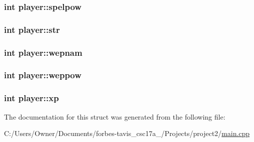 \subsubsection[{spelpow}]{\setlength{\rightskip}{0pt plus 5cm}int player\+::spelpow}\label{structplayer_a0f0f1c33783beaaade2cdd81a5667f98}
\hypertarget{structplayer_a3f5afbd398724555af2babef3175b4f5}{}
\subsubsection[{str}]{\setlength{\rightskip}{0pt plus 5cm}int player\+::str}\label{structplayer_a3f5afbd398724555af2babef3175b4f5}
\hypertarget{structplayer_af54eae2ad746a6678b9128b652abf56e}{}
\subsubsection[{wepnam}]{\setlength{\rightskip}{0pt plus 5cm}int player\+::wepnam}\label{structplayer_af54eae2ad746a6678b9128b652abf56e}
\hypertarget{structplayer_ac15eb781c66d6a0af1d5f1898f7ec64b}{}
\subsubsection[{weppow}]{\setlength{\rightskip}{0pt plus 5cm}int player\+::weppow}\label{structplayer_ac15eb781c66d6a0af1d5f1898f7ec64b}
\hypertarget{structplayer_a370a68f0051f4990d825e8847d2ddc09}{}
\subsubsection[{xp}]{\setlength{\rightskip}{0pt plus 5cm}int player\+::xp}\label{structplayer_a370a68f0051f4990d825e8847d2ddc09}


The documentation for this struct was generated from the following file\+:\begin{DoxyCompactItemize}
\item 
C\+:/\+Users/\+Owner/\+Documents/forbes-\/tavis\+\_\+csc17a\+\_/\+Projects/project2/\hyperlink{main_8cpp}{main.\+cpp}\end{DoxyCompactItemize}
